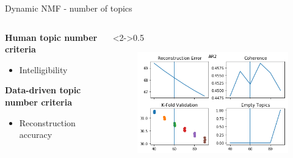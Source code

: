 \documentclass[9pt]{beamer}
\begin{document}
\begin{frame}[t]{Dynamic NMF - number of topics}

\begin{columns}
	\begin{column}{0.5\linewidth}
		\textbf{Human topic number criteria}
		\begin{itemize}
			\item Intelligibility
		\end{itemize}
		\textbf{Data-driven topic number criteria}
		\begin{itemize}
			\item Reconstruction accuracy
		\end{itemize}
	\end{column}
	\begin{column}<2->{0.5\linewidth}
		
\begin{figure}
	\includegraphics[width=0.8\linewidth]{../plots/topic_validations_AR2}
	

\end{figure}
\end{column}
\end{columns}
\end{frame}
\end{document}
